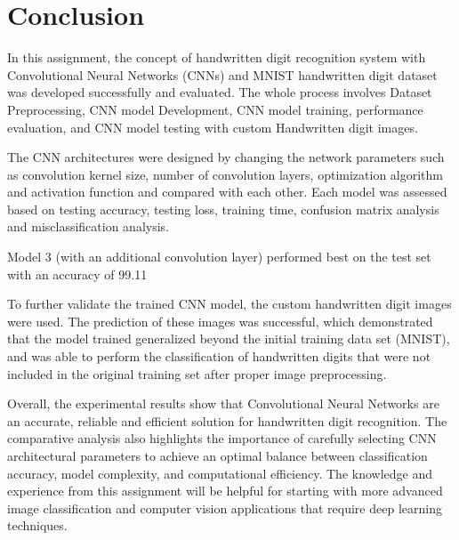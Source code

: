 
\section{Conclusion}

In this assignment, the concept of handwritten digit recognition system with Convolutional Neural Networks (CNNs) and MNIST handwritten digit dataset was developed successfully and evaluated. The whole process involves Dataset Preprocessing, CNN model Development, CNN model training, performance evaluation, and CNN model testing with custom Handwritten digit images.

The CNN architectures were designed by changing the network parameters such as convolution kernel size, number of convolution layers, optimization algorithm and activation function and compared with each other. Each model was assessed based on testing accuracy, testing loss, training time, confusion matrix analysis and misclassification analysis.

Model 3 (with an additional convolution layer) performed best on the test set with an accuracy of 99.11%

To further validate the trained CNN model, the custom handwritten digit images were used. The prediction of these images was successful, which demonstrated that the model trained generalized beyond the initial training data set (MNIST), and was able to perform the classification of handwritten digits that were not included in the original training set after proper image preprocessing.

Overall, the experimental results show that Convolutional Neural Networks are an accurate, reliable and efficient solution for handwritten digit recognition. The comparative analysis also highlights the importance of carefully selecting CNN architectural parameters to achieve an optimal balance between classification accuracy, model complexity, and computational efficiency. The knowledge and experience from this assignment will be helpful for starting with more advanced image classification and computer vision applications that require deep learning techniques.